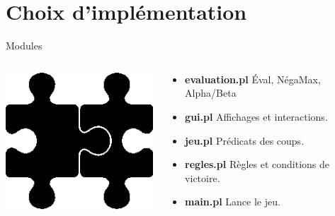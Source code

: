 \documentclass[compress, 12pt]{beamer}
\begin{document}
\section{Choix d’implémentation}
    \begin{frame}{Modules}
        \begin{columns}
        \begin{column}{.2\textwidth}
            \includegraphics[width=1\textwidth]{./pix/sym_puzzle}
        \end{column}
        \begin{column}{.8\textwidth}

  \begin{itemize}
    \item \textbf{evaluation.pl} Éval, NégaMax, Alpha/Beta
    \item \textbf{gui.pl} Affichages et interactions.
    \item \textbf{jeu.pl} Prédicats des coups.
    \item \textbf{regles.pl} Règles et conditions de victoire.
    \item \textbf{main.pl} Lance le jeu.
  \end{itemize}
        \end{column}
    \end{columns}
\end{frame}
\end{document}
